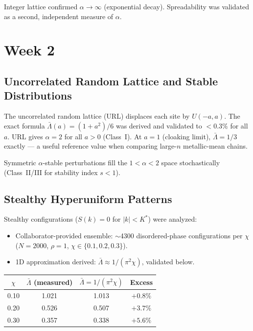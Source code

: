 \documentclass[11pt,letterpaper]{article}
\begin{document}
\vspace{0.3em}\noindent Integer lattice confirmed $\alpha \to \infty$ (exponential decay).
Spreadability was validated as a second, independent measure of $\alpha$.

\section{Week 2}

\subsection{Uncorrelated Random Lattice and Stable Distributions}

The uncorrelated random lattice (URL) displaces each site by $U(-a,a)$.
The exact formula $\bar\Lambda(a) = (1+a^2)/6$ was derived and validated to $<0.3\%$
for all $a$. URL gives $\alpha=2$ for all $a>0$ (Class~I). At $a=1$ (cloaking limit),
$\bar\Lambda = 1/3$ exactly --- a useful reference value when comparing large-$n$
metallic-mean chains.

Symmetric $\alpha$-stable perturbations fill the $1 < \alpha < 2$ space stochastically
(Class~II/III for stability index $s < 1$).

\subsection{Stealthy Hyperuniform Patterns}

Stealthy configurations ($S(k) = 0$ for $|k| < K^*$) were analyzed:
\begin{itemize}[noitemsep]
  \item Collaborator-provided ensemble: $\sim$4300 disordered-phase configurations per
        $\chi$ ($N = 2000$, $\rho = 1$, $\chi \in \{0.1, 0.2, 0.3\}$).
  \item 1D approximation derived: $\bar\Lambda \approx 1/(\pi^2\chi)$, validated below.
\end{itemize}

\noindent\begin{tabular}{cccc}
\toprule
$\chi$ & $\bar\Lambda$ (measured) & $\bar\Lambda = 1/(\pi^2\chi)$ & Excess \\
\midrule
0.10 & 1.021 & 1.013 & $+0.8\%$ \\
0.20 & 0.526 & 0.507 & $+3.7\%$ \\
0.30 & 0.357 & 0.338 & $+5.6\%$ \\
\bottomrule
\end{tabular}
\end{document}
